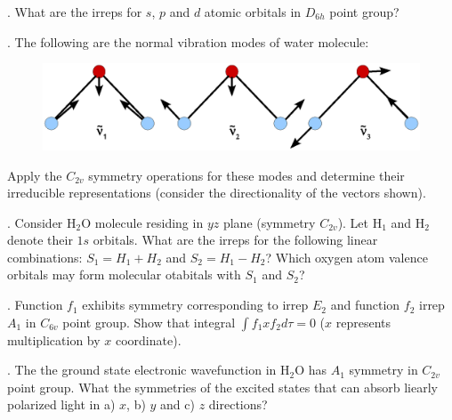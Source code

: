 \vspace{-1cm}


. What are the irreps for $s$, $p$ and $d$ atomic orbitals in $D_{6h}$ point group?\\


. The following are the normal vibration modes of water molecule:\\

\begin{figure}[h]
\centering
\includegraphics[scale=0.4]{water}
\end{figure}

\noindent
Apply the $C_{2v}$ symmetry operations for these modes and determine their irreducible representations
(consider the directionality of the vectors shown).


. Consider H$_2$O molecule residing in $yz$ plane (symmetry $C_{2v}$). Let H$_1$ and H$_2$ denote their $1s$ orbitals. What are the irreps
for the following linear combinations: $S_1 = H_1 + H_2$ and $S_2 = H_1 - H_2$? Which oxygen atom valence orbitals
may form molecular otabitals with $S_1$ and $S_2$?\\


. Function $f_1$ exhibits symmetry corresponding to irrep $E_2$ and function $f_2$ irrep $A_1$ in $C_{6v}$ point group. Show that integral $\int f_1 x f_2d\tau = 0$ ($x$ represents multiplication by $x$ coordinate).\\


. The the ground state electronic wavefunction in H$_2$O has $A_1$ symmetry in $C_{2v}$ point group. What the symmetries
of the excited states that can absorb liearly polarized light in a) $x$, b) $y$ and c) $z$ directions?\\

